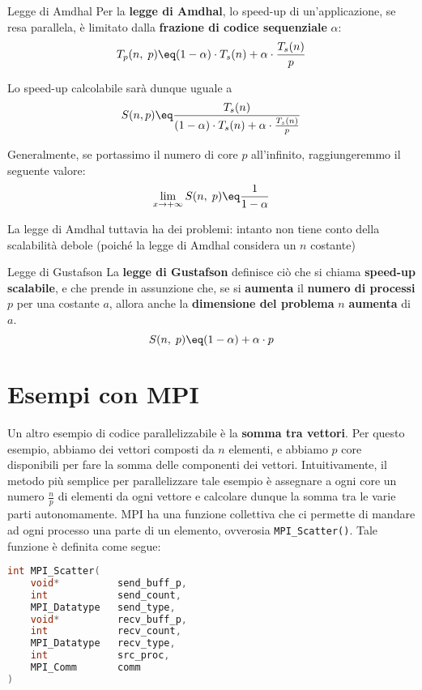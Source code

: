 \begin{definition}{Legge di Amdhal}
    Per la \textbf{legge di Amdhal}, lo speed-up di un'applicazione, se resa parallela, è limitato dalla \textbf{frazione di codice sequenziale} $\alpha$:
    \[ T_p(n, \; p) \eq (1 - \alpha) \cdot T_s(n) + \alpha \cdot \frac{T_s(n)}{p} \]

    Lo speed-up calcolabile sarà dunque uguale a
    \[ S(n, p) \eq \frac{T_s(n)}{(1 - \alpha) \cdot T_s(n) + \alpha \cdot \frac{T_s(n)}{p}} \]
\end{definition}

Generalmente, se portassimo il numero di core $p$ all'infinito, raggiungeremmo il seguente valore:
\[ \lim_{x \to +\infty} S(n, \; p) \eq \frac{1}{1 - \alpha} \]

\noindent La legge di Amdhal tuttavia ha dei problemi: intanto non tiene conto della scalabilità debole (poiché la legge di Amdhal considera un $n$ costante) %

\begin{definition}{Legge di Gustafson}
    La \textbf{legge di Gustafson} definisce ciò che si chiama \textbf{speed-up scalabile}, e che prende in assunzione che, se si \textbf{aumenta} il \textbf{numero di processi} $p$ per una costante $a$, allora anche la \textbf{dimensione del problema} $n$ \textbf{aumenta} di $a$.
    \[ S(n, \; p) \eq (1 - \alpha) + \alpha \cdot p \]
\end{definition}

\section{Esempi con MPI}


Un altro esempio di codice parallelizzabile è la \textbf{somma tra vettori}. Per questo esempio, abbiamo dei vettori composti da $n$ elementi, e abbiamo $p$ core disponibili per fare la somma delle componenti dei vettori. Intuitivamente, il metodo più semplice per parallelizzare tale esempio è assegnare a ogni core un numero $\frac{n}{p}$ di elementi da ogni vettore e calcolare dunque la somma tra le varie parti autonomamente.
\nl
MPI ha una funzione collettiva che ci permette di mandare ad ogni processo una parte di un elemento, ovverosia \verb|MPI_Scatter()|. Tale funzione è definita come segue:

\begin{lstlisting}[language = C, numbers = none]
int MPI_Scatter(
    void*          send_buff_p,
    int            send_count,
    MPI_Datatype   send_type,
    void*          recv_buff_p,
    int            recv_count,
    MPI_Datatype   recv_type,
    int            src_proc,
    MPI_Comm       comm
)\end{lstlisting}

